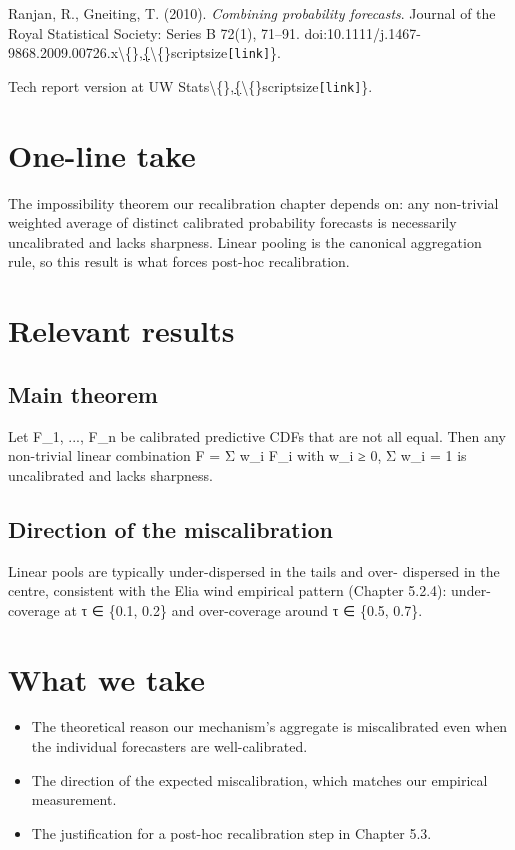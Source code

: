 \documentclass[11pt,a4paper,openany]{report}
\begin{document}
Ranjan, R., Gneiting, T. (2010). \emph{Combining probability forecasts}.
Journal of the Royal Statistical Society: Series B 72(1), 71–91.
doi:10.1111/j.1467-9868.2009.00726.x\textbackslash\{\},\href{https://doi.org/10.1111/j.1467-9868.2009.00726.x}\{\textbackslash\{\}scriptsize\texttt{[link]}\}.

Tech report version at UW Stats\textbackslash\{\},\href{http://stat.uw.edu/research/tech-reports/combining-probability-forecasts}\{\textbackslash\{\}scriptsize\texttt{[link]}\}.

\section{One-line take}

The impossibility theorem our recalibration chapter depends on: any
non-trivial weighted average of distinct calibrated probability
forecasts is necessarily uncalibrated and lacks sharpness. Linear
pooling is the canonical aggregation rule, so this result is what
forces post-hoc recalibration.

\section{Relevant results}

\subsection{Main theorem}

Let F\_1, ..., F\_n be calibrated predictive CDFs that are not all equal.
Then any non-trivial linear combination F = Σ w\_i F\_i with w\_i ≥ 0,
Σ w\_i = 1 is uncalibrated and lacks sharpness.

\subsection{Direction of the miscalibration}

Linear pools are typically under-dispersed in the tails and over-
dispersed in the centre, consistent with the Elia wind empirical
pattern (Chapter 5.2.4): under-coverage at τ ∈ \{0.1, 0.2\} and
over-coverage around τ ∈ \{0.5, 0.7\}.

\section{What we take}

\begin{itemize}
  \item The theoretical reason our mechanism's aggregate is miscalibrated
    even when the individual forecasters are well-calibrated.
  \item The direction of the expected miscalibration, which matches our
    empirical measurement.
  \item The justification for a post-hoc recalibration step in Chapter 5.3.
\end{itemize}
\end{document}

